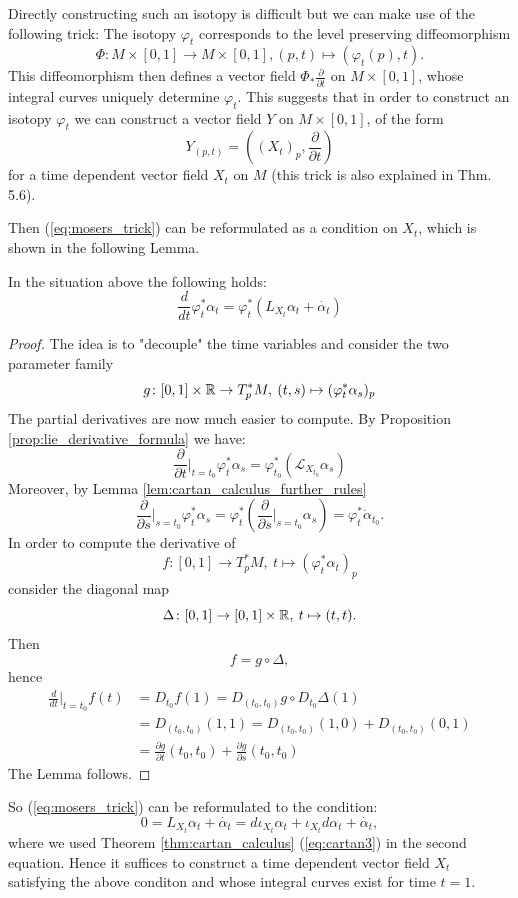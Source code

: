 Directly constructing such an isotopy is difficult but we can make use of the following trick: The isotopy $\varphi_t$ corresponds to the level preserving diffeomorphism
\[
\Phi \colon M \times [0,1] \to M \times [0,1], (p,t) \mapsto (\varphi_t(p),t).
\]
This diffeomorphism then defines a vector field $\Phi_\ast \frac{\partial}{\partial t}$ on $M \times [0,1]$, whose integral curves uniquely determine $\varphi_t$. This suggests that in order to construct an isotopy $\varphi_t$ we can construct a vector field $Y$ on $M \times [0,1]$, of the form 
\[
Y_{(p,t)} = ((X_t)_p, \frac{\partial}{\partial t}) 
\]
for a time dependent vector field $X_t$ on $M$ (this trick is also explained in \cite{Milnor1965hcobord} Thm. 5.6). 

Then (\ref{eq:mosers_trick}) can be reformulated as a condition on $X_t$, which is shown in the following Lemma.

\begin{lemma}
    \label{lem:mosers_trick_lemma}
    In the situation above the following holds:
    \[
    \frac{d}{dt} \varphi_t^\ast \alpha_t = \varphi_t^\ast(L_{X_t}\alpha_t + \dot{\alpha_t})
    \]
\end{lemma}

\begin{proof}
    The idea is to "decouple" the time variables and consider the two parameter family
    \[
        g \colon [0,1] \times \mathbb{R} \to T_p^\ast M, \: (t,s) \mapsto (\varphi_t^\ast \alpha_s)_p
    \]
    The partial derivatives are now much easier to compute. By Proposition \ref{prop:lie_derivative_formula} we have:
    \[
    \frac{\partial}{\partial t}\bigg|_{t=t_0} \varphi_t^\ast \alpha_s = \varphi_{t_0}^\ast(\mathcal{L}_{X_{t_0}} \alpha_s)
    \]
    Moreover, by Lemma \ref{lem:cartan_calculus_further_rules}
    \[
        \frac{\partial}{\partial s}\bigg|_{s=t_0} \varphi_t^\ast \alpha_s = \varphi_t^\ast \left(\frac{\partial}{\partial s}\bigg|_{s=t_0}  \alpha_s \right) = \varphi_t^\ast \dot{\alpha}_{t_0}.
    \]
    In order to compute the derivative of 
    \[
    f \colon [0,1] \to T_p^\ast M, \: t \mapsto (\varphi_t^\ast \alpha_t)_p
    \]
    consider the diagonal map
    \[
    \Delta \colon [0,1] \to [0,1] \times \mathbb{R}, \: t \mapsto (t,t).
    \]
    Then
    \[
    f = g \circ\Delta,
    \]
    hence
    \begin{align*}
        \frac{d}{dt} \bigg|_{t = t_0} f(t) & = D_{t_0}f(1) = D_{(t_0,t_0)}g \circ D_{t_0}\Delta (1) \\
        & = D_{(t_0,t_0)}(1,1) = D_{(t_0,t_0)}(1,0) + D_{(t_0,t_0)}(0,1) \\
        & = \frac{\partial g}{\partial t} (t_0,t_0) + \frac{\partial g}{\partial s} (t_0,t_0)  
    \end{align*}
    The Lemma follows.
\end{proof}
So (\ref{eq:mosers_trick}) can be reformulated to the condition:
\[
    0 = L_{X_t}\alpha_t + \dot{\alpha_t} = d\iota_{X_t}\alpha_t + \iota_{X_t}d\alpha_t + \dot{\alpha_t},
\]
where we used Theorem \ref{thm:cartan_calculus} (\ref{eq:cartan3}) in the second equation. Hence it suffices to construct a time dependent vector field $X_t$ satisfying the above conditon and whose integral curves exist for time $t = 1$. 


